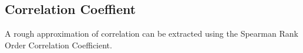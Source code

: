 \subsection{Correlation Coeffient}
\label{sec:weathercorrelationcoeff}

A rough approximation of correlation can be extracted using the Spearman Rank Order Correlation Coefficient.